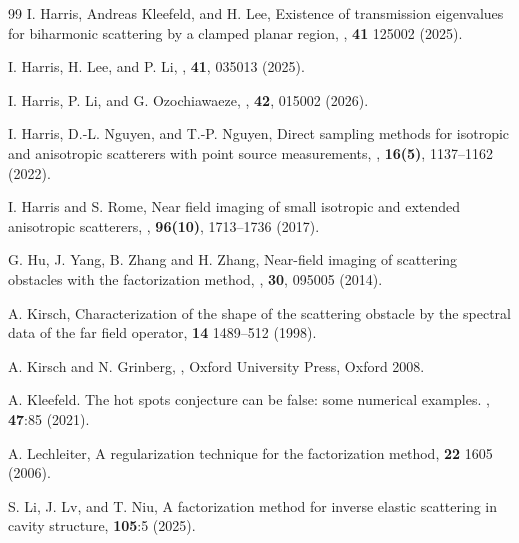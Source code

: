 \documentclass{article}
\numberwithin{equation}{section}
\begin{document}
{\begin{thebibliography}{99}
\newblock I. Harris, Andreas Kleefeld, and H. Lee,
\newblock Existence of transmission eigenvalues for biharmonic scattering by a clamped planar region,
, {\bf 41} 125002 (2025). 



\newblock I. Harris, H. Lee, and P. Li,
, {\bf 41}, 035013 (2025).


\newblock I. Harris, P. Li, and G. Ozochiawaeze,
, {\bf 42}, 015002 (2026).


\newblock I. Harris, D.-L. Nguyen, and T.-P. Nguyen,
\newblock Direct sampling methods for isotropic and anisotropic scatterers with point source measurements,
, {\bf 16(5)}, 1137--1162 (2022). 


\newblock I. Harris and S. Rome, 
\newblock Near field imaging of small isotropic and extended anisotropic scatterers,  
, {\bf 96(10)}, 1713--1736 (2017).


\newblock G. Hu, J. Yang, B. Zhang and H. Zhang,
\newblock Near-field imaging of scattering obstacles with the factorization method,
, {\bf 30}, 095005 (2014). 


\newblock A. Kirsch, 
\newblock Characterization of the shape of the scattering obstacle by the spectral data of the far field operator,
 {\bf 14} 1489--512 (1998).


\newblock A. Kirsch and N.  Grinberg, 
,
\newblock Oxford University Press, Oxford 2008.


\newblock A. Kleefeld. The hot spots conjecture can be false: some numerical examples.
, {\bf 47}:{85} (2021).


\newblock A. Lechleiter, 
\newblock A regularization technique for the factorization method, 
 {\bf 22} 1605 (2006). 



\newblock S. Li, J. Lv, and T. Niu, 
\newblock A factorization method for inverse elastic scattering in cavity structure, 
 {\bf 105}:5 (2025). 



\end{thebibliography}}
\end{document}
